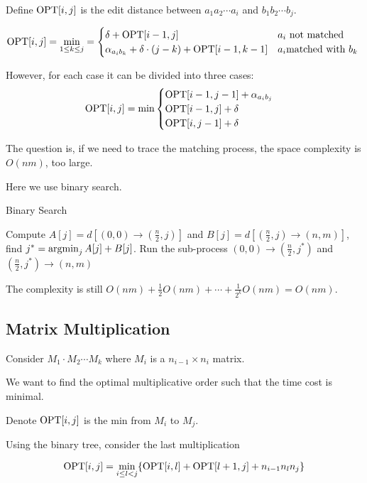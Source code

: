 Define  $ \mathrm{OPT}[i,j] $ is the edit distance between  $ a_1a_2\cdots a_i $ and  $ b_1b_2\cdots b_j $.



\[\mathrm{OPT}[i,j]=\min_{1 \leq k \leq j}=\begin{cases}
    \delta+\mathrm{OPT}[i-1,j]&a_i\text{ not matched}\\
    \alpha_{a_ib_k}+\delta\cdot (j-k)+\mathrm{OPT}[i-1,k-1]&a_i\text{matched with  $ b_k $ }
\end{cases}\]

However, for each case it can be divided into three cases:
\[\mathrm{OPT}[i,j]=\min\begin{cases}
    \mathrm{OPT}[i-1,j-1]+\alpha_{a_ib_j}\\
    \mathrm{OPT}[i-1,j]+\delta\\
    \mathrm{OPT}[i,j-1]+\delta
\end{cases}\]

The question is, if we need to trace the matching process, the space complexity is  $ O(nm) $, too large.

Here we use binary search.
\begin{algorithm}
    \caption{Binary Search}
    \begin{algorithmic}[1]
        \STATE Compute  $ A[j]=d[(0,0)\rightarrow(\frac{n}{2},j)] $ and  $B[j]= d[(\frac{n}{2},j)\rightarrow(n,m)] $,
        \STATE find  $ j^*=\operatorname{argmin}_j A[j]+B[j] $.
        \STATE Run the sub-process  $ (0,0)\rightarrow(\frac{n}{2},j^*) $ and  $ (\frac{n}{2},j^*)\rightarrow(n,m) $ 
    \end{algorithmic}
\end{algorithm}

The complexity is still  $ O(nm)+\frac{1}{2}O(nm)+\cdots+\frac{1}{2^k}O(nm)=O(nm) $.

\subsection{Matrix Multiplication}

\begin{example}
    Consider  $ M_1\cdot M_2\cdots M_k $ where  $ M_i $ is a  $ n_{i-1}\times n_i $ matrix. 

    We want to find the optimal multiplicative order such that the time cost is minimal.
\end{example}

Denote  $ \mathrm{OPT}[i,j] $ is the min from  $ M_i $ to  $ M_j $.

Using the binary tree, consider the last multiplication

\[\mathrm{OPT}[i,j]=\min_{i \leq l<j}\{\mathrm{OPT}[i,l]+\mathrm{OPT}[l+1,j]+n_{i-1}n_ln_j\}\]


